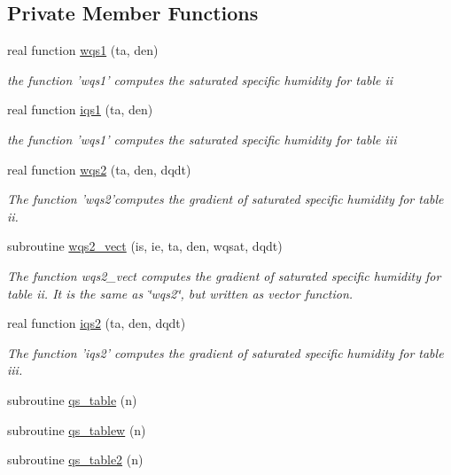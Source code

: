 \subsection*{Private Member Functions}
\begin{DoxyCompactItemize}
\item 
real function \hyperlink{classfv__cmp__mod_a9168ab47a84d56e7dfc5529472be0c71}{wqs1} (ta, den)
\begin{DoxyCompactList}\small\item\em the function 'wqs1' computes the saturated specific humidity for table ii \end{DoxyCompactList}\item 
real function \hyperlink{classfv__cmp__mod_a328511270fbc27b0b736bab8ac486967}{iqs1} (ta, den)
\begin{DoxyCompactList}\small\item\em the function 'wqs1' computes the saturated specific humidity for table iii \end{DoxyCompactList}\item 
real function \hyperlink{classfv__cmp__mod_a21a51056703b3ebc85fb3d3e3e3f23aa}{wqs2} (ta, den, dqdt)
\begin{DoxyCompactList}\small\item\em The function 'wqs2'computes the gradient of saturated specific humidity for table ii. \end{DoxyCompactList}\item 
subroutine \hyperlink{classfv__cmp__mod_ac016ceb177d822853885183c1f4c724f}{wqs2\-\_\-vect} (is, ie, ta, den, wqsat, dqdt)
\begin{DoxyCompactList}\small\item\em The function wqs2\-\_\-vect computes the gradient of saturated specific humidity for table ii. It is the same as \char`\"{}wqs2\char`\"{}, but written as vector function. \end{DoxyCompactList}\item 
real function \hyperlink{classfv__cmp__mod_aca9c0d54335dbc33cc56cb74006fed26}{iqs2} (ta, den, dqdt)
\begin{DoxyCompactList}\small\item\em The function 'iqs2' computes the gradient of saturated specific humidity for table iii. \end{DoxyCompactList}\item 
subroutine \hyperlink{classfv__cmp__mod_a7d7f969ce1e9d84aae4a911ead816e96}{qs\-\_\-table} (n)
\item 
subroutine \hyperlink{classfv__cmp__mod_a416061516bcffc2cab55e9a801b6d1c2}{qs\-\_\-tablew} (n)
\item 
subroutine \hyperlink{classfv__cmp__mod_a27624ed32cc760d05eb6faa1f748970e}{qs\-\_\-table2} (n)
\end{DoxyCompactItemize}
